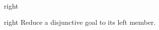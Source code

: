 \begin{tactic}{right}
  \begin{tsyntax}[empty]{right}
  Reduce a disjunctive goal to its left member.
  \end{tsyntax}
\end{tactic}

